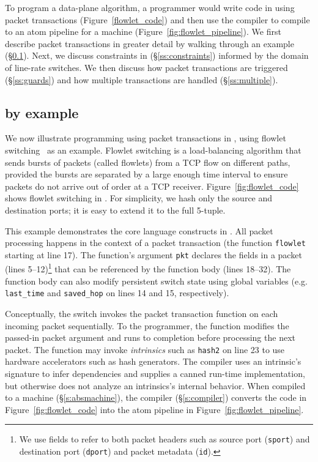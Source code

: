 To program a data-plane algorithm, a programmer would write code in
\pktlanguage using packet transactions (Figure~\ref{flowlet_code}) and then use
the \pktlanguage compiler to compile to an atom pipeline for a \absmachine
machine (Figure~\ref{fig:flowlet_pipeline}). We first describe packet
transactions in greater detail by walking through an example
(\S\ref{ss:flowlet}). Next, we discuss constraints in \pktlanguage
(\S\ref{ss:constraints}) informed by the domain of line-rate switches. We then
discuss how packet transactions are triggered (\S\ref{ss:guards}) and how
multiple transactions are handled (\S\ref{ss:multiple}).

\subsection{\pktlanguage by example}
\label{ss:flowlet}

We now illustrate programming using packet transactions in \pktlanguage, using
flowlet switching~\cite{flowlets} as an example. Flowlet switching is a
load-balancing algorithm that sends bursts of packets (called flowlets) from a
TCP flow on different paths, provided the bursts are separated by a large
enough time interval to ensure packets do not arrive out of order at a TCP
receiver. Figure~\ref{fig:flowlet_code} shows flowlet switching in
\pktlanguage. For simplicity, we hash only the source and destination ports; it
is easy to extend it to the full 5-tuple.

This example demonstrates the core language constructs in \pktlanguage. All
packet processing happens in the context of a packet transaction (the function
\texttt{flowlet} starting at line 17). The function's argument {\tt pkt}
declares the fields in a packet (lines 5--12)\footnote{We use fields to refer
to both packet headers such as source port ({\tt sport}) and destination port
({\tt dport}) and packet metadata ({\tt id}).} that can be referenced by the
function body (lines 18--32).  The function body can also modify persistent
switch state using global variables (e.g.  \texttt{last\_time} and
\texttt{saved\_hop} on lines 14 and 15, respectively).

Conceptually, the switch invokes the packet transaction function on each
incoming packet sequentially. To the programmer, the function modifies the
passed-in packet argument and runs to completion before processing the next
packet.  The function may invoke \textit{intrinsics} such as \texttt{hash2} on
line 23 to use hardware accelerators such as hash generators.  The \pktlanguage
compiler uses an intrinsic's signature to infer dependencies and supplies a
canned run-time implementation, but otherwise does not analyze an intrinsics's
internal behavior. When compiled to a \absmachine machine
(\S\ref{s:absmachine}), the \pktlanguage compiler (\S\ref{s:compiler}) converts
the code in Figure~\ref{fig:flowlet_code} into the atom pipeline in
Figure~\ref{fig:flowlet_pipeline}.

